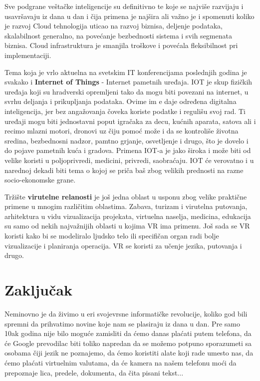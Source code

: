 \documentclass[a4paper]{article}
\begin{document}
{\begin{itemize}
		\end{itemize}
Sve podgrane veštačke inteligencije su definitivno te koje se najviše razvijaju i usavršavaju iz dana u dan i čija primena je najšira ali važno je i spomenuti koliko je razvoj Cloud tehnologija uticao na razvoj biznisa, deljenje podataka, skalabilnost generalno, na povećanje bezbednosti sistema i svih segmenata biznisa. Cloud infrastruktura je smanjila troškove i povećala fleksibilnost pri implementaciji.

Tema koja je vrlo aktuelna na svetskim IT konferencijama poslednjih godina je svakako i {\bf Internet of Things} - Internet pametnih uređaja. IOT je skup fizičkih uređaja koji su hradverski opremljeni tako da mogu biti povezani na internet, u svrhu deljanja i prikupljanja podataka. Ovime im e daje određena digitalna inteligencija, jer bez angažovanja čoveka koriste podatke i regulišu svoj rad. Ti uređaji mogu biti jednostavni poput igračaka za decu, kućnih aparata, satova ali i recimo mlazni motori, dronovi uz čiju pomoć može i da se kontroliše životna sredina, bezbednosni nadzor, pamtno grjanje, osvetljenje i drugo, što je dovelo i do pojave pametnih kuća i gradova. Primena IOT-a je jako široka i može biti od velike koristi u poljoprivredi, medicini, privredi, saobraćaju. IOT će verovatno i u narednoj dekadi biti tema o kojoj se priča baš zbog velikih prednosti na razne socio-ekonomske grane. \cite{iot}

Tržište {\bf virutelne relanosti} je još jedna oblast u usponu zbog velike praktične primene u mnogim različitim oblastima. Zabava, turizam i virutelna putovanja, arhitektura u vidu vizualizacija projekata, virtuelna naselja, medicina, edukacija su samo od nekih najvažnijih oblasti u kojima VR ima primenu. Još sada se VR koristi kako bi se modeliralo ljudsko telo ili specifičan organ radi bolje vizualizacije i planiranja operacija. VR se koristi za učenje jezika, putovanja i drugo. 

\newpage
\section{Zaključak}
\label{Zaključak}

Neminovno je da živimo u eri svojevrsne informatičke revolucije, koliko god bili spremni da prihvatimo novine koje nam se plasiraju iz dana u dan. Pre samo 10ak godina nije bilo moguće zamisliti da ćemo danas plaćati putem telefona, da će Google prevodilac biti toliko napredan da se možemo potpuno sporazumeti sa osobama čiji jezik ne poznajemo, da ćemo koristiti alate koji rade umesto nas, da ćemo plaćati virtuelnim valutama, da će kamera na našem telefonu moći da prepoznaje lica, predele, dokumenta, da čita pisani tekst... 

}
\end{document}
